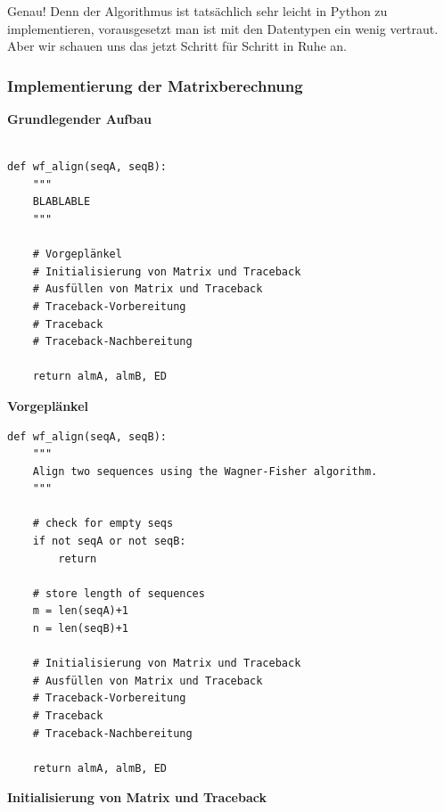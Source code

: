 Genau! Denn der Algorithmus ist tatsächlich sehr leicht in Python zu
implementieren, vorausgesetzt man ist mit den Datentypen ein wenig
vertraut. Aber wir schauen uns das jetzt Schritt für Schritt in Ruhe an.



\subsubsection{Implementierung der Matrixberechnung}

\vspace{0.5cm}\par\noindent\textbf{Grundlegender Aufbau}\vspace{0.5cm}

\begin{verbatim}

def wf_align(seqA, seqB):
    """
    BLABLABLE
    """

    # Vorgeplänkel
    # Initialisierung von Matrix und Traceback
    # Ausfüllen von Matrix und Traceback
    # Traceback-Vorbereitung
    # Traceback
    # Traceback-Nachbereitung

    return almA, almB, ED
\end{verbatim}





\vspace{0.5cm}\par\noindent\textbf{Vorgeplänkel}\vspace{0.5cm}

\begin{verbatim}
def wf_align(seqA, seqB):
    """
    Align two sequences using the Wagner-Fisher algorithm.
    """

    # check for empty seqs
    if not seqA or not seqB:
        return

    # store length of sequences
    m = len(seqA)+1
    n = len(seqB)+1

    # Initialisierung von Matrix und Traceback
    # Ausfüllen von Matrix und Traceback
    # Traceback-Vorbereitung
    # Traceback
    # Traceback-Nachbereitung

    return almA, almB, ED
\end{verbatim}





\vspace{0.5cm}\par\noindent\textbf{Initialisierung von Matrix und Traceback}\vspace{0.5cm}

